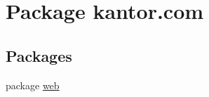 \hypertarget{namespacekantor_1_1com}{\section{Package kantor.\+com}
\label{namespacekantor_1_1com}
}
\subsection*{Packages}
\begin{DoxyCompactItemize}
\item 
package \hyperlink{namespacekantor_1_1com_1_1web}{web}
\end{DoxyCompactItemize}
